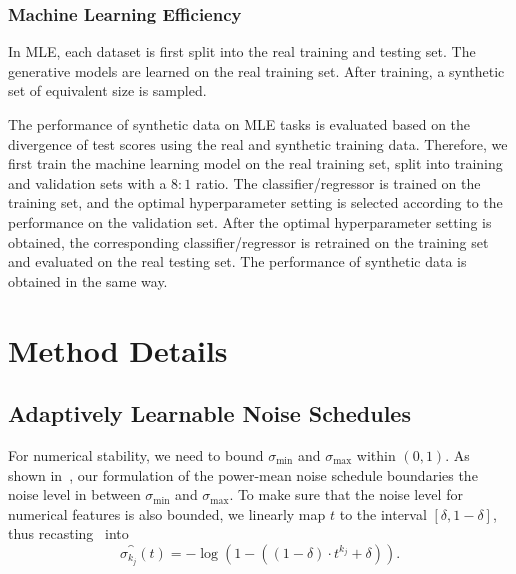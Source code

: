 \subsubsection{Machine Learning Efficiency}
\label{appendix:mle}
In MLE, each dataset is first split into the real training and testing set. The generative models are learned on the real training set. After training, a synthetic set of equivalent size is sampled. 

The performance of synthetic data on MLE tasks is evaluated based on the divergence of test scores using the real and synthetic training data. Therefore, we first train the machine learning model on the real training set, split into training and validation sets with a $8:1$ ratio. The classifier/regressor is trained on the training set, and the optimal hyperparameter setting is selected according to the performance on the validation set. After the optimal hyperparameter setting is obtained, the corresponding classifier/regressor is retrained on the training set and evaluated on the real testing set. The performance of synthetic data is obtained in the same way.

\section{Method Details}
\subsection{Adaptively Learnable Noise Schedules}
\label{appendix:adaptively_learnable_noise_schedule}
For numerical stability, we need to bound $\sigma_{\text{min}}$ and $\sigma_{\text{max}}$ within $(0, 1)$. As shown in~, our formulation of the power-mean noise schedule boundaries the noise level in between $\sigma_\text{min}$ and $\sigma_\text{max}$. To make sure that the noise level for numerical features is also bounded, we linearly map $t$ to the interval $[\delta, 1-\delta]$, thus recasting~ into
\begin{equation}
    {\sigma_{k_j}^{\cat}(t) = -\log\left(1 - \left( (1 -  \delta) \cdot t^{k_j} + \delta \right) \right)}.
\end{equation}

